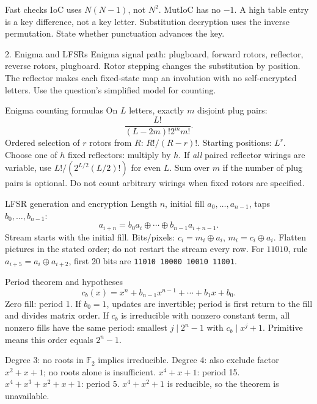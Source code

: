 \documentclass[11pt,a4paper]{article}
\newcommand{\F}{\mathbb F}\newcommand{\Z}{\mathbb Z}
\begin{document}
\begin{tip}{Fast checks}
IoC uses \(N(N-1)\), not \(N^2\). MutIoC has no \(-1\). A high table entry is a key difference, not a key letter. Substitution decryption uses the inverse permutation. State whether punctuation advances the key.
\end{tip}
\clearpage
\begin{concept}{2. Enigma and LFSRs}
Enigma signal path: plugboard, forward rotors, reflector, reverse rotors, plugboard. Rotor stepping changes the substitution by position. The reflector makes each fixed-state map an involution with no self-encrypted letters. Use the question's simplified model for counting.
\end{concept}
\begin{method}{Enigma counting formulas}
On \(L\) letters, exactly \(m\) disjoint plug pairs:
\[\frac{L!}{(L-2m)!2^m m!}.\]
Ordered selection of \(r\) rotors from \(R\): \(R!/(R-r)!\). Starting positions: \(L^r\). Choose one of \(h\) fixed reflectors: multiply by \(h\). If \emph{all} paired reflector wirings are variable, use \(L!/(2^{L/2}(L/2)!)\) for even \(L\). Sum over \(m\) if the number of plug pairs is optional. Do not count arbitrary wirings when fixed rotors are specified.
\end{method}
\begin{concept}{LFSR generation and encryption}
Length \(n\), initial fill \(a_0,\ldots,a_{n-1}\), taps \(b_0,\ldots,b_{n-1}\):
\[a_{i+n}=b_0a_i\oplus\cdots\oplus b_{n-1}a_{i+n-1}.\]
Stream starts with the initial fill. Bits/pixels: \(c_i=m_i\oplus a_i\), \(m_i=c_i\oplus a_i\). Flatten pictures in the stated order; do not restart the stream every row. For \(11010\), rule \(a_{i+5}=a_i\oplus a_{i+2}\), first 20 bits are \texttt{11010 10000 10010 11001}.
\end{concept}
\begin{concept}{Period theorem and hypotheses}
\[c_b(x)=x^n+b_{n-1}x^{n-1}+\cdots+b_1x+b_0.\]
Zero fill: period 1. If \(b_0=1\), updates are invertible; period is first return to the fill and divides matrix order. If \(c_b\) is irreducible with nonzero constant term, all nonzero fills have the same period: smallest \(j\mid2^n-1\) with \(c_b\mid x^j+1\). Primitive means this order equals \(2^n-1\).

Degree 3: no roots in \(\F_2\) implies irreducible. Degree 4: also exclude factor \(x^2+x+1\); no roots alone is insufficient. \(x^4+x+1\): period 15. \(x^4+x^3+x^2+x+1\): period 5. \(x^4+x^2+1\) is reducible, so the theorem is unavailable.
\end{concept}
\end{document}
